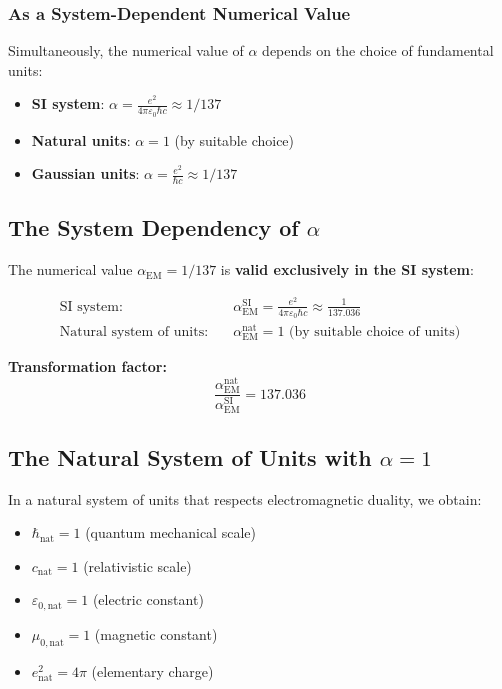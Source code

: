 \subsubsection{As a System-Dependent Numerical Value}
\label{subsubsec:system_dependent}

Simultaneously, the numerical value of $\alpha$ depends on the choice of fundamental units:

\begin{itemize}
	\item \textbf{SI system}: $\alpha = \frac{e^2}{4\pi\varepsilon_0\hbar c} \approx 1/137$
	\item \textbf{Natural units}: $\alpha = 1$ (by suitable choice)
	\item \textbf{Gaussian units}: $\alpha = \frac{e^2}{\hbar c} \approx 1/137$
\end{itemize}

\subsection{The System Dependency of $\alpha$}
\label{subsec:alpha_system_dependency}

The numerical value $\alpha_{\text{EM}} = 1/137$ is \textbf{valid exclusively in the SI system}:

\begin{align}
	\text{SI system:} \quad &\alpha_{\text{EM}}^{\text{SI}} = \frac{e^2}{4\pi\varepsilon_0\hbar c} \approx \frac{1}{137.036} \\
	\text{Natural system of units:} \quad &\alpha_{\text{EM}}^{\text{nat}} = 1 \text{ (by suitable choice of units)}
\end{align}

\textbf{Transformation factor:}
\begin{equation}
	\frac{\alpha_{\text{EM}}^{\text{nat}}}{\alpha_{\text{EM}}^{\text{SI}}} = 137.036
\end{equation}

\subsection{The Natural System of Units with $\alpha = 1$}
\label{subsec:natural_units}

In a natural system of units that respects electromagnetic duality, we obtain:

\begin{itemize}
	\item $\hbar_{\text{nat}} = 1$ (quantum mechanical scale)
	\item $c_{\text{nat}} = 1$ (relativistic scale)
	\item $\varepsilon_{0,\text{nat}} = 1$ (electric constant)
	\item $\mu_{0,\text{nat}} = 1$ (magnetic constant)
	\item $e_{\text{nat}}^2 = 4\pi$ (elementary charge)
\end{itemize}

